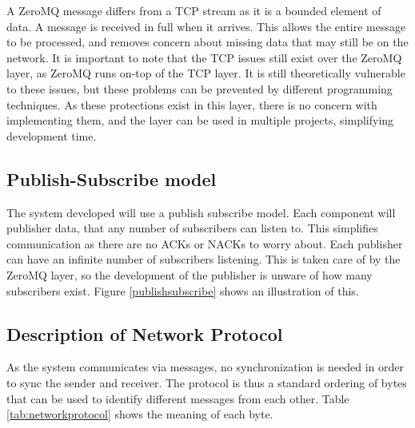 A ZeroMQ message differs from a TCP stream as it is a bounded element of data. A message is received in full when it arrives. This allows the entire message to be processed, and removes concern about missing data that may still be on the network.  It is important to note that the TCP issues still exist over the ZeroMQ layer, as ZeroMQ runs on-top of the TCP layer. It is still theoretically vulnerable to these issues, but these problems can be prevented by different programming techniques. As these protections exist in this layer, there is no concern with implementing them, and the layer can be used in multiple projects, simplifying development time.

\subsection{Publish-Subscribe model}

The system developed will use a publish subscribe model. Each component will publisher data, that any number of subscribers can listen to. This simplifies communication as there are no ACKs or NACKs to worry about. Each publisher can have an infinite number of subscribers listening. This is taken care of by the ZeroMQ layer, so the development of the publisher is unware of how many subscribers exist. Figure \ref{publishsubscribe} shows an illustration of this.


\subsection{Description of Network Protocol}

As the system communicates via messages, no synchronization is needed in order to sync the sender and receiver. The protocol is thus a standard ordering of bytes that can be used to identify different messages from each other. Table \ref{tab:networkprotocol} shows the meaning of each byte.

